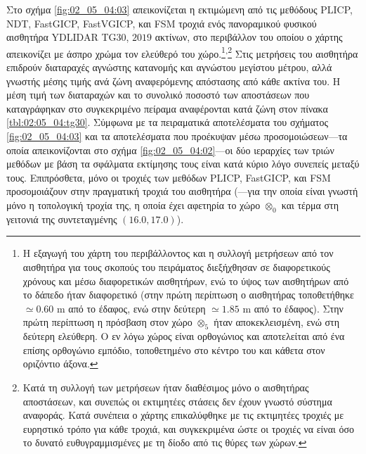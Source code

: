 Στο σχήμα \ref{fig:02_05_04:03} απεικονίζεται η εκτιμώμενη από τις μεθόδους
PLICP, NDT, FastGICP, FastVGICP, και FSM τροχιά ενός πανοραμικού φυσικού
αισθητήρα YDLIDAR TG30, $2019$ ακτίνων, στο περιβάλλον του οποίου ο χάρτης
απεικονίζει με άσπρο χρώμα τον ελεύθερό του χώρο.\footnote{Η εξαγωγή του χάρτη
του περιβάλλοντος και η συλλογή μετρήσεων από τον αισθητήρα για τους σκοπούς
του πειράματος διεξήχθησαν σε διαφορετικούς χρόνους και μέσω διαφορετικών
αισθητήρων, ενώ το ύψος των αισθητήρων από το δάπεδο ήταν διαφορετικό (στην
πρώτη περίπτωση ο αισθητήρας τοποθετήθηκε $\simeq 0.60$ m από το έδαφος, ενώ
στην δεύτερη $\simeq 1.85$ m από το έδαφος). Στην πρώτη περίπτωση η πρόσβαση
στον χώρο $\otimes_5$ ήταν αποκεκλεισμένη, ενώ στη δεύτερη ελεύθερη.  Ο εν λόγω
χώρος είναι ορθογώνιος και αποτελείται από ένα επίσης ορθογώνιο εμπόδιο,
τοποθετημένο στο κέντρο του και κάθετα στον οριζόντιο
άξονα.}\textsuperscript{,}\footnote{Κατά τη συλλογή των μετρήσεων ήταν
διαθέσιμος μόνο ο αισθητήρας αποστάσεων, και συνεπώς οι εκτιμητέες στάσεις δεν
έχουν γνωστό σύστημα αναφοράς. Κατά συνέπεια ο χάρτης επικαλύφθηκε με τις
εκτιμητέες τροχιές με ευρηστικό τρόπο για κάθε τροχιά, και συγκεκριμένα ώστε οι
τροχιές να είναι όσο το δυνατό ευθυγραμμισμένες με τη δίοδο από τις θύρες των
χώρων.} Στις μετρήσεις του αισθητήρα επιδρούν διαταραχές αγνώστης κατανομής και
αγνώστου μεγίστου μέτρου, αλλά γνωστής μέσης τιμής ανά ζώνη αναφερόμενης
απόστασης από κάθε ακτίνα του. Η μέση τιμή των διαταραχών και το συνολικό
ποσοστό των αποστάσεων που καταγράφηκαν στο συγκεκριμένο πείραμα αναφέρονται
κατά ζώνη στον πίνακα \ref{tbl:02:05_04:tg30}.  Σύμφωνα με τα πειραματικά
αποτελέσματα του σχήματος \ref{fig:02_05_04:03} και τα αποτελέσματα που
προέκυψαν μέσω προσομοιώσεων---τα οποία απεικονίζονται στο σχήμα
\ref{fig:02_05_04:02}---οι δύο ιεραρχίες των τριών μεθόδων με βάση τα σφάλματα
εκτίμησης τους είναι κατά κύριο λόγο συνεπείς μεταξύ τους.  Επιπρόσθετα, μόνο
οι τροχιές των μεθόδων PLICP, FastGICP, και FSM προσομοιάζουν στην πραγματική
τροχιά του αισθητήρα (---για την οποία είναι γνωστή μόνο η τοπολογική τροχία
της, η οποία έχει αφετηρία το χώρο $\otimes_0$ και τέρμα στη γειτονιά της
συντεταγμένης $(16.0, 17.0)$).


